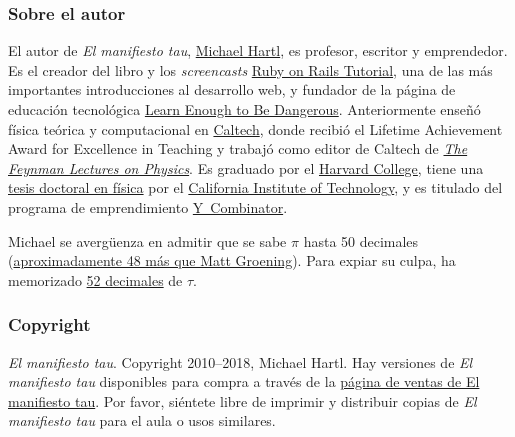 
    \subsubsection{Sobre el autor} %
    \label{sec:about_the_author}


El autor de \emph{El manifiesto tau}, \href{http://www.michaelhartl.com/}{Michael Hartl}, es profesor, escritor y emprendedor. Es el creador del libro y los \textit{screencasts}
\href{http://www.railstutorial.org/}{Ruby on Rails Tutorial}, una de las más importantes introducciones al desarrollo web, y fundador de la página de educación tecnológica \href{http://learnenough.com/}{Learn Enough to Be Dangerous}. Anteriormente enseñó física teórica y computacional en \href{http://www.caltech.edu/}{Caltech}, donde recibió el Lifetime Achievement Award for Excellence in Teaching y trabajó como editor de Caltech de \href{http://www.feynmanlectures.caltech.edu/}{\emph{The Feynman Lectures on Physics}}. Es graduado por el \href{http://college.harvard.edu/}{Harvard College}, tiene una \href{http://thesis.library.caltech.edu/1940/}{tesis doctoral en física} por el \href{http://www.caltech.edu/}{California Institute of Technology}, y es titulado del programa de emprendimiento \href{http://ycombinator.com/}{Y~Combinator}.

Michael se avergüenza en admitir que se sabe $\pi$ hasta 50 decimales (\href{\#fig-futurama_video}{aproximadamente 48 más que Matt Groening}). Para expiar su culpa, ha memorizado \href{http://www.wolframalpha.com/input/?i=N[2+Pi,+53]}{52 decimales} de $\tau$.

    \subsubsection{Copyright} %
    \label{sec:copyright_and_license}

    \emph{El manifiesto tau}. Copyright 2010--2018, Michael Hartl. Hay versiones de \emph{El manifiesto tau} disponibles para compra a través de la \href{http://sales.tauday.com/}{página de ventas de El manifiesto tau}. Por favor, siéntete libre de imprimir y distribuir copias de \emph{El manifiesto tau} para el aula o usos similares.


